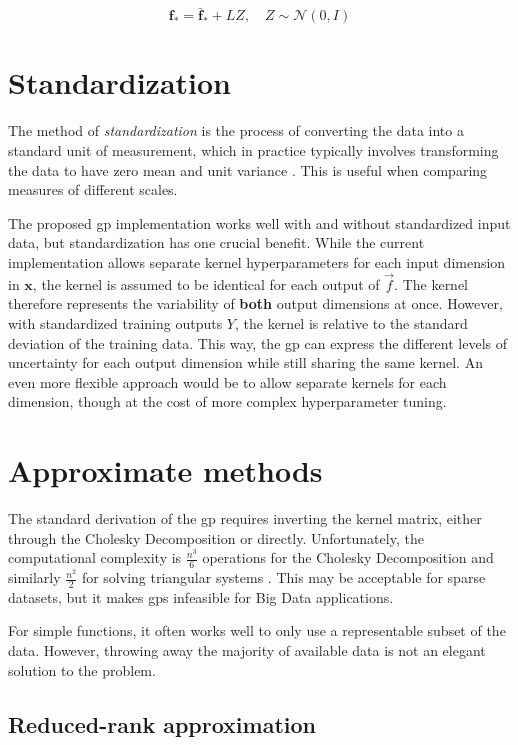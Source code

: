 \begin{equation}
    \boldsymbol{f}_* = \bar{\boldsymbol{f}}_* + L Z, \quad Z \sim \mathcal{N}(0, I)
\end{equation}

\section{Standardization}
The method of \textit{standardization} is the process of converting the data into a standard unit of measurement, which in practice typically involves transforming the data to have zero mean and unit variance \cite{isl}. This is useful when comparing measures of different scales.

The proposed \acrshort{gp} implementation works well with and without standardized input data, but standardization has one crucial benefit. While the current implementation allows separate kernel hyperparameters for each input dimension in $\boldsymbol{x}$, the kernel is assumed to be identical for each output of $\vec{f}$. The kernel therefore represents the variability of \textbf{both} output dimensions at once. However, with standardized training outputs $Y$, the kernel is relative to the standard deviation of the training data. This way, the \acrshort{gp} can express the different levels of uncertainty for each output dimension while still sharing the same kernel. An even more flexible approach would be to allow separate kernels for each dimension, though at the cost of more complex hyperparameter tuning.

\section{Approximate methods}
The standard derivation of the \acrshort{gp} requires inverting the kernel matrix, either through the Cholesky Decomposition or directly. Unfortunately, the computational complexity is $\frac{n^3}{6}$ operations for the Cholesky Decomposition and similarly $\frac{n^2}{2}$ for solving triangular systems \cite{rasmussen}. This may be acceptable for sparse datasets, but it makes \acrshort{gp}s infeasible for Big Data applications. 

For simple functions, it often works well to only use a representable subset of the data. However, throwing away the majority of available data is not an elegant solution to the problem. 

\subsection{Reduced-rank approximation}

